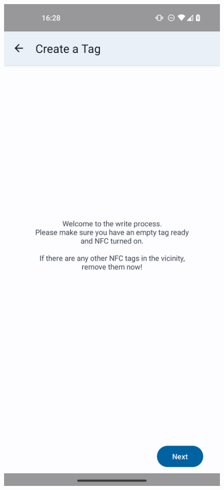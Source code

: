 \documentclass[conference]{IEEEtran}
\newcommand{\phonescreenwidth}{2.69in}
\begin{document}
\begin{figure}
	\centering
	\begin{minipage}{\phonescreenwidth}
		\includegraphics[width=\textwidth]{screenshots/s-intro.png}

\end{minipage}
\end{figure}
\end{document}

